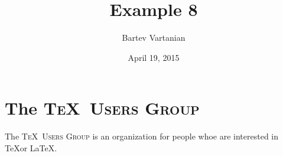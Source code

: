 \documentclass{article}
\newcommand{\TUG}{\textsc{\TeX\ Users Group}\xspace}
\begin{document}
\title{Example 8}
\author{Bartev Vartanian}
\date{April 19, 2015}

\maketitle

\section{The \TUG} %
The \TUG is an organization for people whoe are interested in \TeX or \LaTeX.
\end{document}
